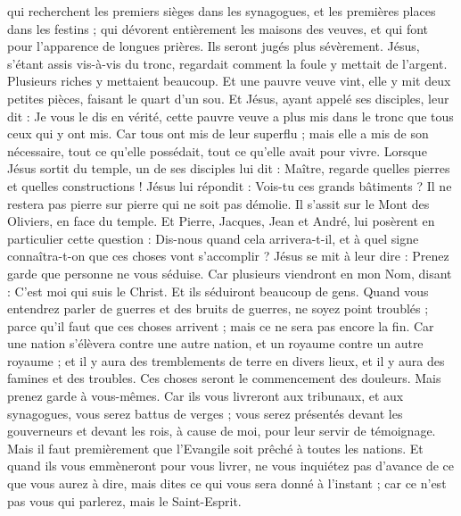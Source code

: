 \begin{multicols}{2}
qui recherchent les premiers sièges dans les synagogues, et les premières places dans les festins ;
qui dévorent entièrement les maisons des veuves, et qui font pour l’apparence de longues prières. Ils seront jugés plus sévèrement.
Jésus, s’étant assis vis-à-vis du tronc, regardait comment la foule y mettait de l'argent. Plusieurs riches y mettaient beaucoup.
Et une pauvre veuve vint, elle y mit deux petites pièces, faisant le quart d’un sou.
Et Jésus, ayant appelé ses disciples, leur dit : Je vous le dis en vérité, cette pauvre veuve a plus mis dans le tronc que tous ceux qui y ont mis.
Car tous ont mis de leur superflu ; mais elle a mis de son nécessaire, tout ce qu'elle possédait, tout ce qu’elle avait pour vivre.
\VerseOne{}Lorsque Jésus sortit du temple, un de ses disciples lui dit : Maître, regarde quelles pierres et quelles constructions !
Jésus lui répondit : Vois-tu ces grands bâtiments ? Il ne restera pas pierre sur pierre qui ne soit pas démolie.
Il s’assit sur le Mont des Oliviers, en face du temple. Et Pierre, Jacques, Jean et André, lui posèrent en particulier cette question :
Dis-nous quand cela arrivera-t-il, et à quel signe connaîtra-t-on que ces choses vont s'accomplir ?
Jésus se mit à leur dire : Prenez garde que personne ne vous séduise.
Car plusieurs viendront en mon Nom, disant : C'est moi qui suis le Christ. Et ils séduiront beaucoup de gens.
Quand vous entendrez parler de guerres et des bruits de guerres, ne soyez point troublés ; parce qu'il faut que ces choses arrivent ; mais ce ne sera pas encore la fin.
Car une nation s'élèvera contre une autre nation, et un royaume contre un autre royaume ; et il y aura des tremblements de terre en divers lieux, et il y aura des famines et des troubles. Ces choses seront le commencement des douleurs.
Mais prenez garde à vous-mêmes. Car ils vous livreront aux tribunaux, et aux synagogues, vous serez battus de verges ; vous serez présentés devant les gouverneurs et devant les rois, à cause de moi, pour leur servir de témoignage.
Mais il faut premièrement que l'Evangile soit prêché à toutes les nations.
Et quand ils vous emmèneront pour vous livrer, ne vous inquiétez pas d’avance de ce que vous aurez à dire, mais dites ce qui vous sera donné à l’instant ; car ce n’est pas vous qui parlerez, mais le Saint-Esprit.

\end{multicols}
